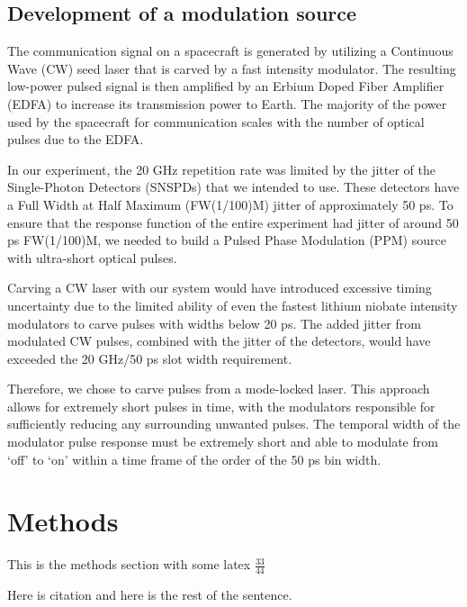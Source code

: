 \documentclass{optica-article}
\begin{document}
\hypertarget{development-of-a-modulation-source}{%
\subsection{Development of a modulation source}\label{development-of-a-modulation-source}}

The communication signal on a spacecraft is generated by utilizing a Continuous Wave (CW) seed laser that is carved by a fast intensity modulator. The resulting low-power pulsed signal is then amplified by an Erbium Doped Fiber Amplifier (EDFA) to increase its transmission power to Earth. The majority of the power used by the spacecraft for communication scales with the number of optical pulses due to the EDFA.

In our experiment, the 20 GHz repetition rate was limited by the jitter of the Single-Photon Detectors (SNSPDs) that we intended to use. These detectors have a Full Width at Half Maximum (FW(1/100)M) jitter of approximately 50 ps. To ensure that the response function of the entire experiment had jitter of around 50 ps FW(1/100)M, we needed to build a Pulsed Phase Modulation (PPM) source with ultra-short optical pulses.

Carving a CW laser with our system would have introduced excessive timing uncertainty due to the limited ability of even the fastest lithium niobate intensity modulators to carve pulses with widths below 20 ps. The added jitter from modulated CW pulses, combined with the jitter of the detectors, would have exceeded the 20 GHz/50 ps slot width requirement.

Therefore, we chose to carve pulses from a mode-locked laser. This approach allows for extremely short pulses in time, with the modulators responsible for sufficiently reducing any surrounding unwanted pulses. The temporal width of the modulator pulse response must be extremely short and able to modulate from `off' to `on' within a time frame of the order of the 50 ps bin width.

\hypertarget{methods}{%
\section{Methods}\label{methods}}

This is the methods section with some latex \(\frac{33}{44}\)

Here is citation \cite{Dolinar2011Photon} and here is the rest of the sentence.


\end{document}
